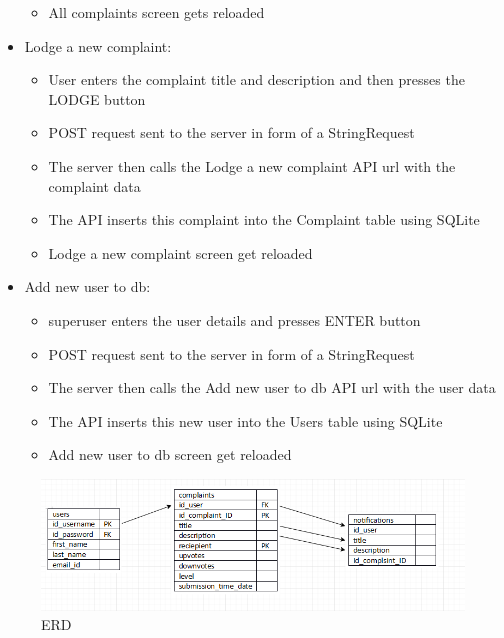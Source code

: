\documentclass[12pt]{article}
\begin{document}
\begin{itemize}
\begin{itemize}
	\item All complaints screen gets reloaded
\end{itemize}
\item Lodge a new complaint:
\begin{itemize}
	\color {blue}
	\item User enters the complaint title and description and then presses the LODGE button
	\item POST request sent to the server in form of a StringRequest
	\item The server then calls the Lodge a new complaint API url with the complaint data
	\item The API inserts this complaint into the Complaint table using SQLite
	\item Lodge a new complaint screen get reloaded
\end{itemize}
\item Add new user to db:
\begin{itemize}
	\color {blue}
	\item superuser enters the user details and presses ENTER button
	\item POST request sent to the server in form of a StringRequest
	\item The server then calls the Add new user to db API url with the user data
	\item The API inserts this new user into the Users table using SQLite
	\item Add new user to db screen get reloaded
\end{itemize}
\end{itemize}

\begin{figure}[ht!]
\includegraphics[width=150mm]{erd.png}
\caption{ERD \label{overflow}}
\end{figure}
\end{document}
